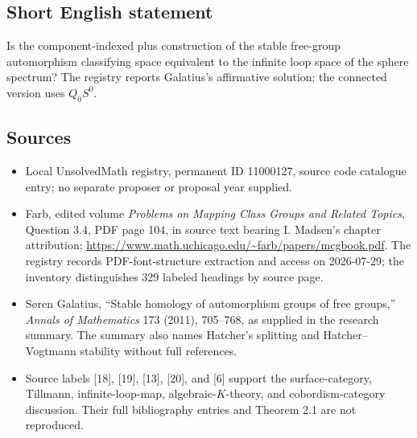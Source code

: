 \documentclass[11pt]{article}
\begin{document}
\subsection{Short English statement}
Is the component-indexed plus construction of the stable free-group automorphism classifying space equivalent to the infinite loop space of the sphere spectrum? The registry reports Galatius's affirmative solution; the connected version uses $Q_0S^0$.
\subsection{Sources}
\begin{itemize}
\item Local UnsolvedMath registry, permanent ID 11000127, source code catalogue entry; no separate proposer or proposal year supplied.
\item Farb, edited volume \emph{Problems on Mapping Class Groups and Related Topics}, Question 3.4, PDF page 104, in source text bearing I. Madsen's chapter attribution; \url{https://www.math.uchicago.edu/~farb/papers/mcgbook.pdf}. The registry records PDF-font-structure extraction and access on 2026-07-29; the inventory distinguishes 329 labeled headings by source page.
\item S\o ren Galatius, ``Stable homology of automorphism groups of free groups,'' \emph{Annals of Mathematics} 173 (2011), 705--768, as supplied in the research summary. The summary also names Hatcher's splitting and Hatcher--Vogtmann stability without full references.
\item Source labels [18], [19], [13], [20], and [6] support the surface-category, Tillmann, infinite-loop-map, algebraic-$K$-theory, and cobordism-category discussion. Their full bibliography entries and Theorem 2.1 are not reproduced.
\end{itemize}
\end{document}
